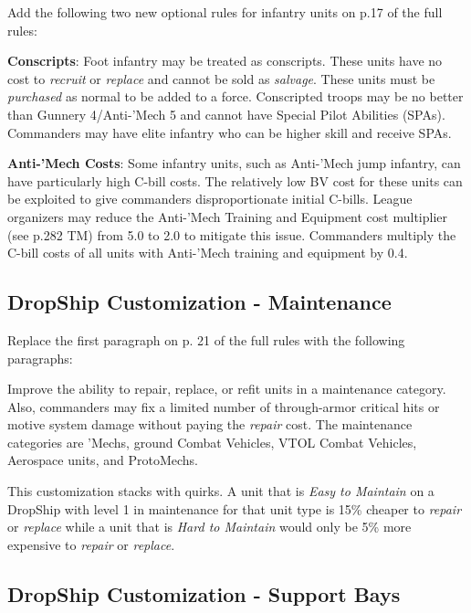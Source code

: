 Add the following two new optional rules for infantry units on p.17 of the full rules:

\begin{description}

\item {\bfseries Conscripts}: Foot infantry may be treated as conscripts.
These units have no cost to \emph{recruit} or \emph{replace} and cannot be sold as \emph{salvage}.
These units must be \emph{purchased} as normal to be added to a force.
Conscripted troops may be no better than Gunnery 4/Anti-'Mech 5 and cannot have Special Pilot Abilities (SPAs).
Commanders may have elite infantry who can be higher skill and receive SPAs.

\item {\bfseries Anti-'Mech Costs}: Some infantry units, such as Anti-'Mech jump infantry, can have particularly high C-bill costs.
The relatively low BV cost for these units can be exploited to give commanders disproportionate initial C-bills.
League organizers may reduce the Anti-'Mech Training and Equipment cost multiplier (see p.282 TM) from 5.0 to 2.0 to mitigate this issue.
Commanders multiply the C-bill costs of all units with Anti-'Mech training and equipment by 0.4.

\end{description}

\subsection{DropShip Customization - Maintenance}

Replace the first paragraph on p. 21 of the full rules with the following paragraphs:

Improve the ability to repair, replace, or refit units in a maintenance category.
Also, commanders may fix a limited number of through-armor critical hits or motive system damage without paying the \emph{repair} cost.
The maintenance categories are 'Mechs, ground Combat Vehicles, VTOL Combat Vehicles, Aerospace units, and ProtoMechs.

This customization stacks with quirks.
A unit that is \emph{Easy to Maintain} on a DropShip with level 1 in maintenance for that unit type is 15\% cheaper to \emph{repair} or \emph{replace} while a unit that is \emph{Hard to Maintain} would only be 5\% more expensive to \emph{repair} or \emph{replace}.

\subsection{DropShip Customization - Support Bays}


